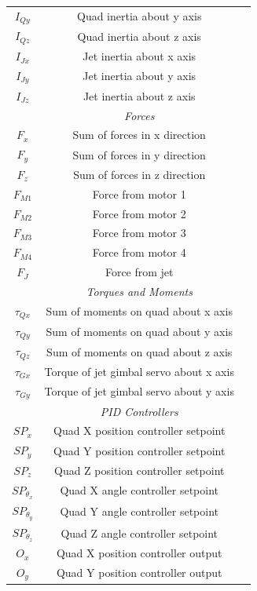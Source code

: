 \documentclass[11pt,twoside]{article}
\begin{document}
\begin{center}
\begin{longtable}{|ccc|}
    $I_{Qy}$ & Quad inertia about y axis & \\
    $I_{Qz}$ & Quad inertia about z axis & \\
    $I_{Jx}$ & Jet inertia about x axis & \\
    $I_{Jy}$ & Jet inertia about y axis & \\
    $I_{Jz}$ & Jet inertia about z axis & \\
    \hline
    & \emph{Forces} & \\
    \hline
    $F_x$ & Sum of forces in x direction & \\
    $F_y$ & Sum of forces in y direction & \\
    $F_z$ & Sum of forces in z direction & \\
    $F_{M1}$ & Force from motor 1 & \\
    $F_{M2}$ & Force from motor 2 & \\
    $F_{M3}$ & Force from motor 3 & \\
    $F_{M4}$ & Force from motor 4 & \\
    $F_J$ & Force from jet & \\
    \hline
    & \emph{Torques and Moments} & \\
    \hline
    $\tau_{Qx}$ & Sum of moments on quad about x axis & \\
    $\tau_{Qy}$ & Sum of moments on quad about y axis & \\
    $\tau_{Qz}$ & Sum of moments on quad about z axis & \\
    $\tau_{Gx}$ & Torque of jet gimbal servo about x axis & \\
    $\tau_{Gy}$ & Torque of jet gimbal servo about y axis & \\
    \hline
    & \emph{PID Controllers} & \\
    \hline
    $SP_x$ & Quad X position controller setpoint & \\
    $SP_y$ & Quad Y position controller setpoint & \\
    $SP_z$ & Quad Z position controller setpoint & \\
    $SP_{\theta_x}$ & Quad X angle controller setpoint & \\
    $SP_{\theta_y}$ & Quad Y angle controller setpoint & \\
    $SP_{\theta_z}$ & Quad Z angle controller setpoint & \\
    $O_x$ & Quad X position controller output & \\
    $O_y$ & Quad Y position controller output & \\

\end{longtable}
\end{center}
\end{document}
